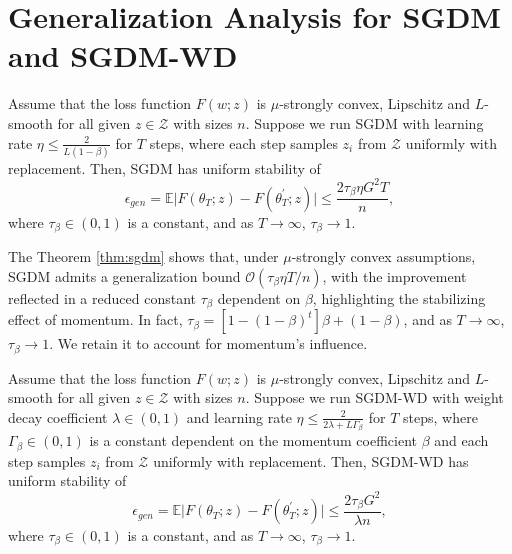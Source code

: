 \section{Generalization Analysis for SGDM and SGDM-WD}\label{gen_SGDM}
\begin{theorem}\label{thm:sgdm}
Assume that the loss function $F(w;z)$ is $\mu$-strongly convex, Lipschitz and $L$-smooth for all given $z\in\mathcal{Z}$ with sizes $n$. Suppose we run SGDM with learning rate $\eta \leq \frac{2}{L(1-\beta)}$ for $T$ steps, where each step samples $z_i$ from $\mathcal{Z}$ uniformly with replacement. Then, SGDM has uniform stability of 
\begin{equation}
  \epsilon_{gen} = \mathbb{E}\vert F(\theta_T;z)-F(\theta^{\prime}_T;z)\vert \leq \frac{2\tau_{\beta}\eta G^2 T}{n},
 \end{equation}
where $\tau_{\beta}\in(0,1)$ is a constant, and as $T\rightarrow\infty$, $\tau_{\beta}\rightarrow 1$. 
\end{theorem}

\begin{remark}
The Theorem \ref{thm:sgdm} shows that, under $\mu$-strongly convex assumptions, SGDM admits a generalization bound $\mathcal{O}(\tau_{\beta}\eta T/n)$, with the improvement reflected in a reduced constant $\tau_\beta$ dependent on $\beta$, highlighting the stabilizing effect of momentum.
In fact, $\tau_\beta=[1-(1-\beta)^t]\beta+(1-\beta)$, and as $T\rightarrow\infty$, $\tau_{\beta}\rightarrow 1$. We retain it to account for momentum's influence.    
\end{remark}

    

\begin{theorem}\label{thm:sgdm-WD}
Assume that the loss function $F(w;z)$ is $\mu$-strongly convex, Lipschitz and $L$-smooth for all given $z\in\mathcal{Z}$ with sizes $n$. Suppose we run SGDM-WD with weight decay coefficient $\lambda \in (0,1)$ and learning rate $\eta \leq \frac{2}{2\lambda + L\Gamma_{\beta}}$ for $T$ steps, where $\Gamma_{\beta}\in(0,1)$ is a constant dependent on the momentum coefficient $\beta$ and each step samples $z_i$ from $\mathcal{Z}$ uniformly with replacement. Then, SGDM-WD has uniform stability of
\begin{equation}
  \epsilon_{gen} = \mathbb{E}\vert F(\theta_T;z)-F(\theta^{\prime}_T;z)\vert \leq \frac{2\tau_{\beta} G^2 }{\lambda n},
 \end{equation}
 where $\tau_{\beta}\in(0,1)$ is a constant, and as $T\rightarrow\infty$, $\tau_{\beta}\rightarrow 1$. 
\end{theorem}

